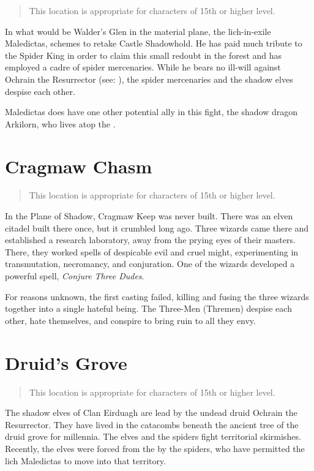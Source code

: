 \begin{quote}
  This location is appropriate for characters of 15th or higher level.
\end{quote}

In what would be Walder's Glen in the material plane, the lich-in-exile Maledictas,
schemes to retake Castle Shadowhold. He has paid much tribute to the Spider King
in order to claim this small redoubt in the forest and has employed a cadre of spider
mercenaries. While he bears no ill-will against Ochrain the Resurrector
(see: ), the spider
mercenaries and the shadow elves despise each other.

Maledictas does have one other potential ally in this fight, the shadow dragon
Arkilorn, who lives atop the .


\section{Cragmaw Chasm} \label{loc:cragmawchasm}

\begin{quote}
  This location is appropriate for characters of 15th or higher level.
\end{quote}

In the Plane of Shadow, Cragmaw Keep was never built. There was an elven citadel
built there once, but it crumbled long ago. Three wizards came there and established
a research laboratory, away from the prying eyes of their masters. There, they worked
spells of despicable evil and cruel might, experimenting in transmutation, necromancy,
and conjuration. One of the wizards developed a powerful spell, \textit{Conjure Three Dudes}.

For reasons unknown, the first casting failed, killing and fusing the three wizards
together into a single hateful being. The Three-Men (Thremen) despise each other,
hate themselves, and conspire to bring ruin to all they envy.

\section{Druid's Grove} \label{loc:druidsgrove}

\begin{quote}
  This location is appropriate for characters of 15th or higher level.
\end{quote}

The shadow elves of Clan Eirduagh are lead by the undead druid Ochrain the Resurrector.
They have lived in the catacombs beneath the ancient tree of the druid grove for
millennia. The elves and the spiders fight territorial skirmishes. Recently, the elves
were forced from the  by the spiders, who have permitted the lich Maledictas
to move into that territory.

